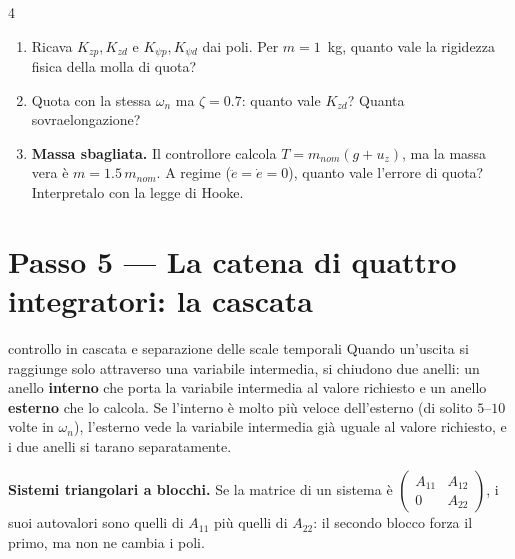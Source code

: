 \documentclass[11pt,a4paper]{article}
\begin{document}
\begin{esercizio}{4}
\begin{enumerate}[label=(\alph*)]
  \item Ricava $K_{zp}, K_{zd}$ e $K_{\psi p}, K_{\psi d}$ dai poli. Per $m = 1$~kg, quanto vale la rigidezza fisica della molla di quota?
  \item Quota con la stessa $\omega_n$ ma $\zeta = 0.7$: quanto vale $K_{zd}$? Quanta sovraelongazione?
  \item \textbf{Massa sbagliata.} Il controllore calcola $T = m_{nom}(g + u_z)$, ma la massa vera è $m = 1.5\,m_{nom}$. A regime ($\ddot e = \dot e = 0$), quanto vale l'errore di quota? Interpretalo con la legge di Hooke.
\end{enumerate}
\end{esercizio}

\section{Passo 5 --- La catena di quattro integratori: la cascata}

\begin{teoria}{controllo in cascata e separazione delle scale temporali}
Quando un'uscita si raggiunge solo attraverso una variabile intermedia, si chiudono due anelli: un anello \textbf{interno} che porta la variabile intermedia al valore richiesto e un anello \textbf{esterno} che lo calcola. Se l'interno è molto più veloce dell'esterno (di solito $5$--$10$ volte in $\omega_n$), l'esterno vede la variabile intermedia già uguale al valore richiesto, e i due anelli si tarano separatamente.

\textbf{Sistemi triangolari a blocchi.} Se la matrice di un sistema è $\begin{pmatrix} A_{11} & A_{12} \\ 0 & A_{22} \end{pmatrix}$, i suoi autovalori sono quelli di $A_{11}$ più quelli di $A_{22}$: il secondo blocco forza il primo, ma non ne cambia i poli.
\end{teoria}
\end{document}
